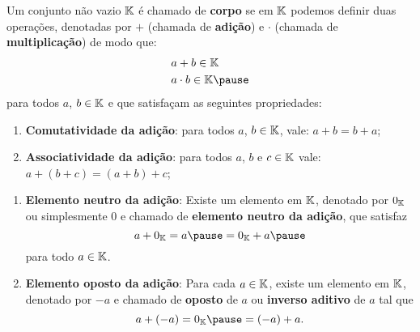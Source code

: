 \documentclass{beamer}
\begin{document}
    \begin{frame}
        \begin{definicao}
	    Um conjunto n\~ao vazio $\mathbb{K}$ \'e chamado de \textbf{corpo} \pause se em $\mathbb{K}$ podemos definir duas opera\c{c}\~oes, denotadas por $+$ (chamada de \textbf{adi\c{c}\~ao}) \pause e $\cdot$ (chamada de \textbf{multiplica\c{c}\~ao}) \pause de modo que:
            \begin{align*}
                a &+ b \in \cp{K}\\
    	        a &\cdot b \in \cp{K}\pause
            \end{align*}
            para todos $a$, $b \in \mathbb{K}$ \pause e que satisfa\c{c}am as seguintes propriedades:\pause
	    \begin{enumerate}[label={\roman*})]
                \item \textbf{Comutatividade da adi\c{c}\~ao}: para todos $a$, $b \in \mathbb{K}$, \pause vale: \pause $a + b = b + a$;\pause
		\item \textbf{Associatividade da adi\c{c}\~ao}: para todos $a$, $b$ e $c \in \mathbb{K}$ vale: \pause $a + (b + c) = (a + b) + c$;
                \seti
            \end{enumerate}
        \end{definicao}
    \end{frame}

    \begin{frame}
        \begin{definicao}
            \begin{enumerate}[label={\roman*})]
                \conti
		\item \textbf{Elemento neutro da adi\c{c}\~ao}: Existe um elemento em $\mathbb{K}$, denotado por $0_{\mathbb{K}}$ \pause ou simplesmente $0$ e chamado de \textbf{elemento neutro da adi\c{c}\~ao}, \pause que satisfaz\pause
		\[
                    a + 0_\cp{K} = a\pause = 0_\cp{K} + a\pause
		\]
		para todo $a \in \mathbb{K}$.\pause
		\item \textbf{Elemento oposto da adi\c{c}\~ao}: Para cada $a \in \mathbb{K}$, \pause existe um elemento em $\mathbb{K}$, denotado por $-a$ \pause e chamado de \textbf{oposto} de $a$ \pause ou \textbf{inverso aditivo} de $a$ tal que\pause
		\[
                    a + (-a) = 0_\cp{K}\pause = (-a) + a.
		\]

                \seti
            \end{enumerate}
        \end{definicao}
    \end{frame}
\end{document}
